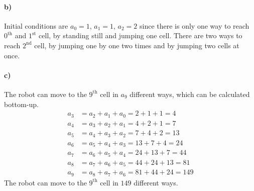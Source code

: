 \documentclass[12pt]{article}
\newcommand{\+}{\mkern2mu}
\begin{document}
\paragraph{b)}
Initial conditions are $a_0 = 1$, $a_1 = 1$, $a_2 = 2$ since there is only one way to reach $0^\text{th}$ and $1^\text{st}$ cell, by standing still and jumping one cell. There are two ways to reach $2^\text{nd}$ cell, by jumping one by one two times and by jumping two cells at once.

\paragraph{c)}
The robot can move to the $9^\text{th}$ cell in $a_9$ different ways, which can be calculated bottom-up.
\begin{align*}
    a_3 &= a_2 + a_1 + a_0 = 2 + 1 + 1 = 4 \\
    a_4 &= a_3 + a_2 + a_1 = 4 + 2 + 1 = 7 \\
    a_5 &= a_4 + a_3 + a_2 = 7 + 4 + 2 = 13 \\
    a_6 &= a_5 + a_4 + a_3 = 13 + 7 + 4 = 24 \\
    a_7 &= a_6 + a_5 + a_4 = 24 + 13 + 7 = 44 \\
    a_8 &= a_7 + a_6 + a_5 = 44 + 24 + 13 = 81 \\
    a_9 &= a_8 + a_7 + a_6 = 81 + 44 + 24 = 149
\end{align*}
The robot can move to the $9^\text{th}$ cell in $149$ different ways.
\end{document}
